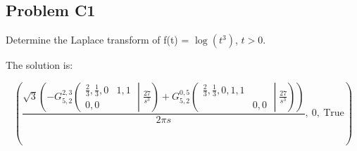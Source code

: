 \subsection{Problem C1} Determine the Laplace transform of f(t) = \(\log{\left(t^{3} \right)}\), \(t > 0\).

    \medskip
    The solution is:
    
    \smallskip
     \begin{equation}
         \left( \frac{\sqrt{3} \left(- {G_{5, 2}^{2, 3}\left(\begin{matrix} \frac{2}{3}, \frac{1}{3}, 0 & 1, 1 \\0, 0 &  \end{matrix} \middle| {\frac{27}{s^{3}}} \right)} + {G_{5, 2}^{0, 5}\left(\begin{matrix} \frac{2}{3}, \frac{1}{3}, 0, 1, 1 &  \\ & 0, 0 \end{matrix} \middle| {\frac{27}{s^{3}}} \right)}\right)}{2 \pi s}, \  0, \  \text{True}\right)
     \end{equation}
 
